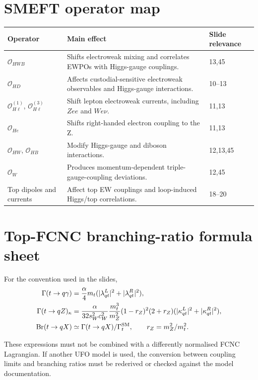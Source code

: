 \documentclass[11pt,a4paper]{report}
\newcommand{\br}{\mathrm{Br}}
\begin{document}
\chapter{SMEFT operator map}
\begin{longtable}{p{}p{}p{}}
\toprule
Operator & Main effect & Slide relevance \\
\midrule
$\mathcal O_{HWB}$ & Shifts electroweak mixing and correlates EWPOs with Higgs-gauge couplings. & 13,45 \\
$\mathcal O_{HD}$ & Affects custodial-sensitive electroweak observables and Higgs-gauge interactions. & 10--13 \\
$\mathcal O_{H\ell}^{(1)}$, $\mathcal O_{H\ell}^{(3)}$ & Shift lepton electroweak currents, including $Zee$ and $We\nu$. & 11,13 \\
$\mathcal O_{He}$ & Shifts right-handed electron coupling to the Z. & 11,13 \\
$\mathcal O_{HW}$, $\mathcal O_{HB}$ & Modify Higgs-gauge and diboson interactions. & 12,13,45 \\
$\mathcal O_W$ & Produces momentum-dependent triple-gauge-coupling deviations. & 12,45 \\
Top dipoles and currents & Affect top EW couplings and loop-induced Higgs/top correlations. & 18--20 \\
\bottomrule
\end{longtable}

\chapter{Top-FCNC branching-ratio formula sheet}
For the convention used in the slides,
\begin{align}
\Gamma(t\to q\gamma)&=\frac{\alpha}{4}m_t(|\lambda^L_{qt}|^2+|\lambda^R_{qt}|^2),\\
\Gamma(t\to qZ)_\kappa&=\frac{\alpha}{32s_W^2c_W^2}\frac{m_t^3}{m_Z^2}(1-r_Z)^2(2+r_Z)(|\kappa^L_{qt}|^2+|\kappa^R_{qt}|^2),\\
\br(t\to qX)&\simeq\Gamma(t\to qX)/\Gamma_t^{\rm SM},\qquad r_Z=m_Z^2/m_t^2.
\end{align}
\begin{warningbox}
These expressions must not be combined with a differently normalised FCNC Lagrangian.  If another UFO model is used, the conversion between coupling limits and branching ratios must be rederived or checked against the model documentation.
\end{warningbox}
\end{document}
